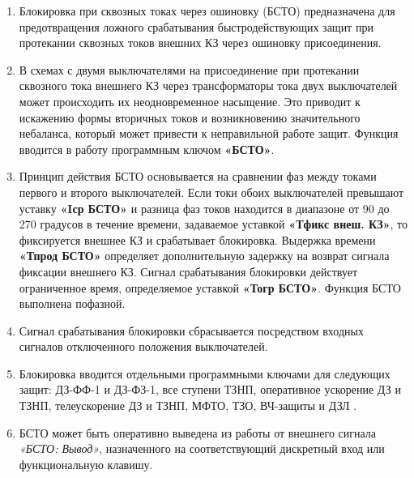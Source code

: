 \color{black}

\begin{enumerate}

\item
Блокировка при сквозных токах через ошиновку (БСТО) предназначена для предотвращения ложного срабатывания быстродействующих защит при протекании сквозных токов внешних КЗ через ошиновку присоединения.

\item
В схемах с двумя выключателями на присоединение при протекании сквозного тока внешнего КЗ через трансформаторы тока двух выключателей может происходить их неодновременное насыщение. Это приводит к искажению формы вторичных токов и возникновению значительного небаланса, который может привести к неправильной работе защит. Функция вводится в работу программным ключом \textbf{«БСТО»}.

\item
Принцип действия БСТО основывается на сравнении фаз между токами первого и второго выключателей. Если токи обоих выключателей превышают уставку \textbf{«Iср БСТО»} и разница фаз токов находится в диапазоне от 90 до 270 градусов в течение времени, задаваемое уставкой \textbf{«Тфикс внеш. КЗ»}, то фиксируется внешнее КЗ и срабатывает блокировка. Выдержка времени \textbf{«Тпрод БСТО»} определяет дополнительную задержку на возврат сигнала фиксации внешнего КЗ. Сигнал срабатывания блокировки действует ограниченное время, определяемое уставкой \textbf{«Тогр БСТО»}. Функция БСТО выполнена пофазной.

\item
Сигнал срабатывания блокировки сбрасывается посредством входных сигналов отключенного положения выключателей.

\item
Блокировка вводится отдельными программными ключами для следующих защит: ДЗ-ФФ-1 и ДЗ-ФЗ-1, все ступени ТЗНП, оперативное ускорение ДЗ и ТЗНП, телеускорение ДЗ и ТЗНП, МФТО, ТЗО, ВЧ-защиты и ДЗЛ .


\item
БСТО может быть оперативно выведена из работы от внешнего сигнала \textit{«БСТО: Вывод»}, назначенного на соответствующий дискретный вход или функциональную клавишу.


\end{enumerate}

